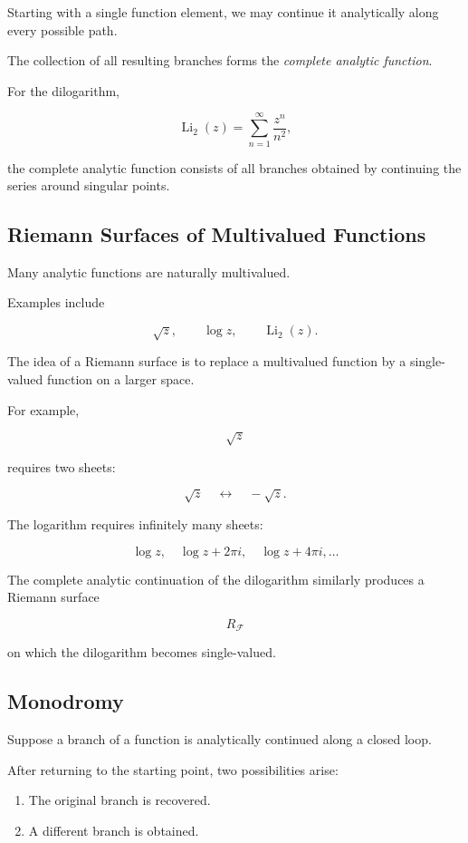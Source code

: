 \documentclass[12pt,a4paper]{article}
\theoremstyle{notespace}
\begin{document}
Starting with a single function element, we may continue it analytically along every possible path.

The collection of all resulting branches forms the \emph{complete analytic function}.

For the dilogarithm,

\[
\operatorname{Li}_2(z)
=
\sum_{n=1}^{\infty}\frac{z^n}{n^2},
\]

the complete analytic function consists of all branches obtained by continuing the series around singular points.

\subsection{Riemann Surfaces of Multivalued Functions}

Many analytic functions are naturally multivalued.

Examples include

\[
\sqrt z,
\qquad
\log z,
\qquad
\operatorname{Li}_2(z).
\]

The idea of a Riemann surface is to replace a multivalued function by a single-valued function on a larger space.

\medskip

For example,

\[
\sqrt z
\]

requires two sheets:

\[
\sqrt z
\quad\leftrightarrow\quad
-\sqrt z.
\]

The logarithm requires infinitely many sheets:

\[
\log z,
\quad
\log z+2\pi i,
\quad
\log z+4\pi i,
\ldots
\]

The complete analytic continuation of the dilogarithm similarly produces a Riemann surface

\[
R_{\mathcal F}
\]

on which the dilogarithm becomes single-valued.

\subsection{Monodromy}

Suppose a branch of a function is analytically continued along a closed loop.

After returning to the starting point, two possibilities arise:

\begin{enumerate}
	\item The original branch is recovered.
	\item A different branch is obtained.
\end{enumerate}
\end{document}
